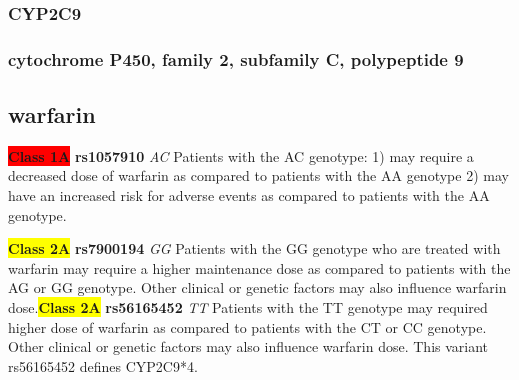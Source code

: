 \documentclass{book}
\begin{document}
\subsubsection{ CYP2C9 }
\subsubsection{ cytochrome P450, family 2, subfamily C, polypeptide 9 }

\subsection{ warfarin }


\begin{center}
\textbf{\colorbox{red} {Class 1A}} \textbf{ rs1057910 } \textit{ AC }
Patients with the AC genotype: 1) may require a decreased dose of warfarin as compared to patients with the AA genotype 2) may have an increased risk for adverse events as compared to patients with the AA genotype.

\textbf{\colorbox{yellow} {Class 2A}} \textbf{ rs7900194 } \textit{ GG }
Patients with the GG genotype who are treated with warfarin may require a higher maintenance dose as compared to patients with the AG or GG genotype.  Other clinical or genetic factors may also influence warfarin dose.\textbf{\colorbox{yellow} {Class 2A}} \textbf{ rs56165452 } \textit{ TT }
Patients with the TT genotype may required higher dose of warfarin as compared to patients with the CT or CC genotype. Other clinical or genetic factors may also influence  warfarin dose. This variant rs56165452 defines CYP2C9*4.


\end{center}
\end{document}
